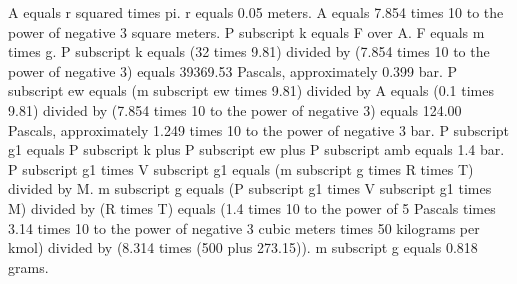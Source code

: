 A equals r squared times pi.
r equals 0.05 meters.
A equals 7.854 times 10 to the power of negative 3 square meters.
P subscript k equals F over A.
F equals m times g.
P subscript k equals (32 times 9.81) divided by (7.854 times 10 to the power of negative 3) equals 39369.53 Pascals, approximately 0.399 bar.
P subscript ew equals (m subscript ew times 9.81) divided by A equals (0.1 times 9.81) divided by (7.854 times 10 to the power of negative 3) equals 124.00 Pascals, approximately 1.249 times 10 to the power of negative 3 bar.
P subscript g1 equals P subscript k plus P subscript ew plus P subscript amb equals 1.4 bar.
P subscript g1 times V subscript g1 equals (m subscript g times R times T) divided by M.
m subscript g equals (P subscript g1 times V subscript g1 times M) divided by (R times T) equals (1.4 times 10 to the power of 5 Pascals times 3.14 times 10 to the power of negative 3 cubic meters times 50 kilograms per kmol) divided by (8.314 times (500 plus 273.15)).
m subscript g equals 0.818 grams.